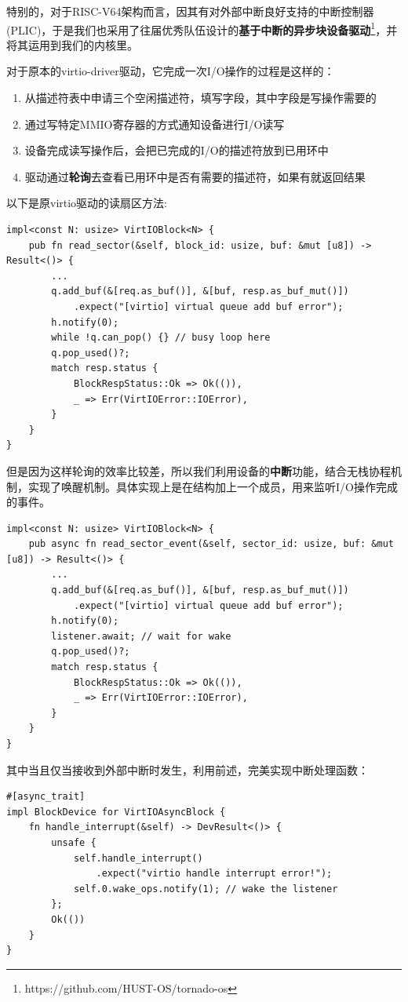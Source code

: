 \documentclass{article}
\begin{document}
特别的，对于RISC-V64架构而言，因其有对外部中断良好支持的中断控制器(PLIC)，于是我们也采用了往届优秀队伍设计的\textbf{基于中断的异步块设备驱动}\footnote{https://github.com/HUST-OS/tornado-os}，并将其运用到我们的内核里。

对于原本的virtio-driver驱动，它完成一次I/O操作的过程是这样的：
    \begin{enumerate}
        \item 从描述符表中申请三个空闲描述符，填写字段，其中字段是写操作需要的
        \item 通过写特定MMIO寄存器的方式通知设备进行I/O读写
        \item 设备完成读写操作后，会把已完成的I/O的描述符放到已用环中
        \item 驱动通过\textbf{轮询}去查看已用环中是否有需要的描述符，如果有就返回结果
    \end{enumerate}

以下是原virtio驱动的读扇区方法:
\begin{lstlisting}
impl<const N: usize> VirtIOBlock<N> {
    pub fn read_sector(&self, block_id: usize, buf: &mut [u8]) -> Result<()> {
        ...
        q.add_buf(&[req.as_buf()], &[buf, resp.as_buf_mut()])
            .expect("[virtio] virtual queue add buf error");
        h.notify(0);
        while !q.can_pop() {} // busy loop here
        q.pop_used()?; 
        match resp.status {
            BlockRespStatus::Ok => Ok(()),
            _ => Err(VirtIOError::IOError),
        }
    }
}
\end{lstlisting}

但是因为这样轮询的效率比较差，所以我们利用设备的\textbf{中断}功能，结合无栈协程机制，实现了唤醒机制。具体实现上是在结构加上一个成员，用来监听I/O操作完成的事件。
\begin{lstlisting}
impl<const N: usize> VirtIOBlock<N> {
    pub async fn read_sector_event(&self, sector_id: usize, buf: &mut [u8]) -> Result<()> {
        ...
        q.add_buf(&[req.as_buf()], &[buf, resp.as_buf_mut()])
            .expect("[virtio] virtual queue add buf error");
        h.notify(0);
        listener.await; // wait for wake
        q.pop_used()?;
        match resp.status {
            BlockRespStatus::Ok => Ok(()),
            _ => Err(VirtIOError::IOError),
        }
    }
}
\end{lstlisting}

其中当且仅当接收到外部中断时发生，利用前述，完美实现中断处理函数：
\begin{lstlisting}
#[async_trait]
impl BlockDevice for VirtIOAsyncBlock {
    fn handle_interrupt(&self) -> DevResult<()> {
        unsafe {
            self.handle_interrupt()
                .expect("virtio handle interrupt error!");
            self.0.wake_ops.notify(1); // wake the listener
        };
        Ok(())
    }
}
\end{lstlisting}
\end{document}
